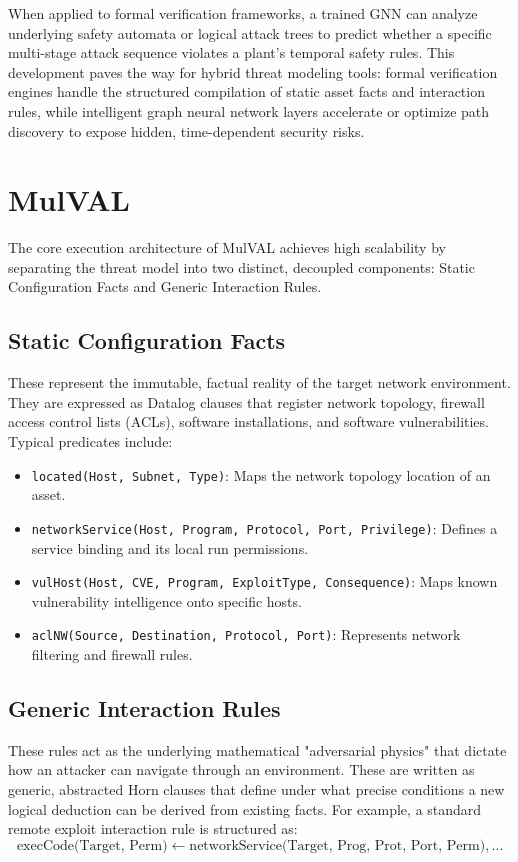 \documentclass[target=mst,aauheader=aics,style=]{thud}
\begin{document}
When applied to formal verification frameworks, a trained GNN can analyze underlying safety automata or logical attack trees to predict whether a specific multi-stage attack sequence violates a plant's temporal safety rules. This development paves the way for hybrid threat modeling tools: formal verification engines handle the structured compilation of static asset facts and interaction rules, while intelligent graph neural network layers accelerate or optimize path discovery to expose hidden, time-dependent security risks.

\section{MulVAL}
The core execution architecture of MulVAL achieves high scalability by separating the threat model into two distinct, decoupled components: Static Configuration Facts and Generic Interaction Rules.

\subsection{Static Configuration Facts}
These represent the immutable, factual reality of the target network environment. They are expressed as Datalog clauses that register network topology, firewall access control lists (ACLs), software installations, and software vulnerabilities. Typical predicates include:
\begin{itemize}
    \item \texttt{located(Host, Subnet, Type)}: Maps the network topology location of an asset.
    \item \texttt{networkService(Host, Program, Protocol, Port, Privilege)}: Defines a service binding and its local run permissions.
    \item \texttt{vulHost(Host, CVE, Program, ExploitType, Consequence)}: Maps known vulnerability intelligence onto specific hosts.
    \item \texttt{aclNW(Source, Destination, Protocol, Port)}: Represents network filtering and firewall rules.
\end{itemize}

\subsection{Generic Interaction Rules}
These rules act as the underlying mathematical "adversarial physics" that dictate how an attacker can navigate through an environment. These are written as generic, abstracted Horn clauses that define under what precise conditions a new logical deduction can be derived from existing facts. For example, a standard remote exploit interaction rule is structured as:
\begin{equation*}
\text{execCode(Target, Perm)} \leftarrow \text{networkService(Target, Prog, Prot, Port, Perm)}, \dots
\end{equation*}
\end{document}

